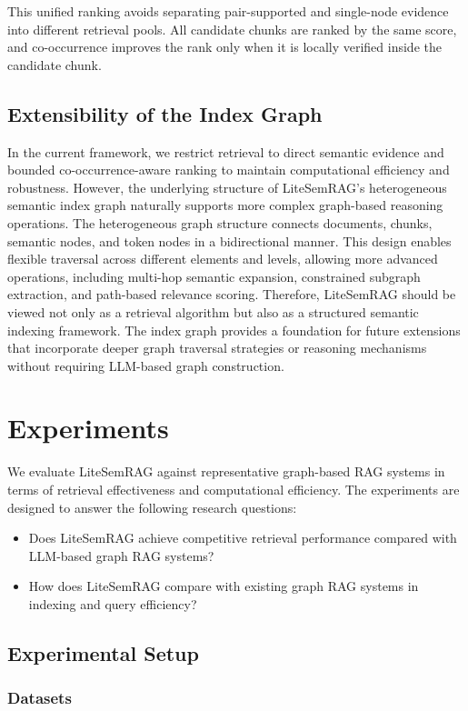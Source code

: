 \documentclass[conference]{IEEEtran}
\begin{document}
This unified ranking avoids separating pair-supported and single-node evidence into different retrieval pools. All candidate chunks are ranked by the same score, and co-occurrence improves the rank only when it is locally verified inside the candidate chunk.

\subsection{Extensibility of the Index Graph}
In the current framework, we restrict retrieval to direct semantic evidence and bounded co-occurrence-aware ranking to maintain computational efficiency and robustness. However, the underlying structure of LiteSemRAG's heterogeneous semantic index graph naturally supports more complex graph-based reasoning operations. The heterogeneous graph structure connects documents, chunks, semantic nodes, and token nodes in a bidirectional manner. This design enables flexible traversal across different elements and levels, allowing more advanced operations, including multi-hop semantic expansion, constrained subgraph extraction, and path-based relevance scoring. Therefore, LiteSemRAG should be viewed not only as a retrieval algorithm but also as a structured semantic indexing framework. The index graph provides a foundation for future extensions that incorporate deeper graph traversal strategies or reasoning mechanisms without requiring LLM-based graph construction.

\section{Experiments}
We evaluate LiteSemRAG against representative graph-based RAG systems in terms of retrieval effectiveness and computational efficiency. The experiments are designed to answer the following research questions:
\begin{itemize}
    \item Does LiteSemRAG achieve competitive retrieval performance compared with LLM-based graph RAG systems?
    \item How does LiteSemRAG compare with existing graph RAG systems in indexing and query efficiency?
\end{itemize}

\subsection{Experimental Setup}

\subsubsection{Datasets}
\end{document}
